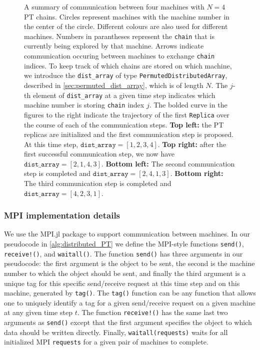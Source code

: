 \begin{figure}[t]
\begin{subfigure}{0.48\textwidth}
  \end{subfigure}
  \caption{
    A summary of communication between four machines with $N=4$ PT chains.
    Circles represent machines with the machine number in the center of the circle. 
    Different colours are also used for different machines.
    Numbers in parantheses represent the \texttt{chain} 
    that is currently being explored by that machine. 
    Arrows indicate communication occuring between machines to exchange \texttt{chain} 
    indices.
    To keep track of which chains are stored on which machine, we introduce the 
    \texttt{dist\_array} of type \texttt{PermutedDistributedArray}, described in 
    \cref{sec:permuted_dist_array}, which is of length $N$. 
    The $j$-th element of \texttt{dist\_array} at a given time step indicates which 
    machine number is storing \texttt{chain} index $j$.
    The bolded curve in the figures to the right indicate the trajectory of the first 
    \texttt{Replica} over the course of each of the communication steps.      
    \textbf{Top left:} the PT replicas are initialized and the first communication step 
    is proposed. At this time step, $\texttt{dist\_array} = [1,2,3,4]$.
    \textbf{Top right:} after the first successful communication step, we now have 
    $\texttt{dist\_array} = [2,1,4,3]$.
    \textbf{Bottom left:} The second communication step is completed and 
    $\texttt{dist\_array} = [2,4,1,3]$.
    \textbf{Bottom right:} The third communication step is completed and 
    $\texttt{dist\_array} = [4,2,3,1]$.}
  \label{fig:index_process}
\end{figure}

\subsubsection{MPI implementation details}
We use the MPI.jl \cite{byrne2021mpi} package to support communication between machines. 
In our pseudocode in \cref{alg:distributed_PT} we define the MPI-style 
functions \texttt{send()}, \texttt{receive!()}, 
and \texttt{waitall()}. 
The function \texttt{send()} has three arguments in our pseudocode: the first argument 
is the object to be sent, the second is the machine number to which the object should 
be sent, and finally the third argument is a unique tag for this specific send/receive 
request at this time step and on this machine, generated by \texttt{tag()}.
The \texttt{tag()} function can be any function that allows one to uniquely identify 
a tag for a given send/receive request on a given machine at any given time step $t$.
The function \texttt{receive!()} has the same last two arguments as \texttt{send()} 
except that the first argument 
specifies the object to which data should be written directly. Finally, 
\texttt{waitall(requests)} waits for all initialized MPI \texttt{requests} for a given pair 
of machines to complete.

